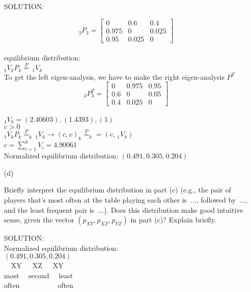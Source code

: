 \documentclass[12pt]{article}
\begin{document}
\begin{itemize}
SOLUTION:

\begin{equation} 
_3P_3 = \left[ \begin{array}{ccc} 
0 & 0.6 & 0.4 \\
0.975 & 0 & 0.025 \\
0.95 & 0.025 & 0
\end{array} 
\right]
\end{equation} \\
equilibrium distribution: \\
\indent \indent $_1V_k P_k \stackrel{P}{=} \, _1V_k$ \\
To get the left eigen-analysis, we have to make the right eigen-analysis $P^T$\\
\begin{equation} 
_3P_3^T = \left[ \begin{array}{ccc} 
0 & 0.975 & 0.95 \\
0.6 & 0 & 0.05 \\
0.4 & 0.025 & 0
\end{array} 
\right]
\end{equation} \\
$_1V_k = (2.40603), (1.4393), (1)$\\
$c > 0$\\
$_1V_k P_k \stackrel{P}{=}_k \, _1V_k \rightarrow (c,v)_k  \stackrel{P}{=}_k = (c, \,  _1V_k)$\\
$c = \sum_{i=1}^{k} V_i = 4.90061$\\
Normalized equilibrium distribution: $( 0.491, 0.305, 0.204 )$ \\


\item[(d)]

Briefly interpret the equilibrium distribution in part (c) (e.g., the pair of players that's most often at the table playing each other is~..., followed by~..., and the least frequent pair is~...). Does this distribution make good intuitive sense, given the vector $( p_{ XY }, p_{ XZ }, p_{ YZ } )$ in part (c)? Explain briefly. \fbox{\textit{[10 points]}}

SOLUTION: \\

Normalized equilibrium distribution:
\\ $( 0.491, 0.305, 0.204 )$ \\
\, \,  XY \,\, \,  XZ \, \,\,  XY \, \, \\
most \, \, second \, \, least\\
often \, \, \, \, \, \, \, \, \, \, often


\end{itemize}
\end{document}
